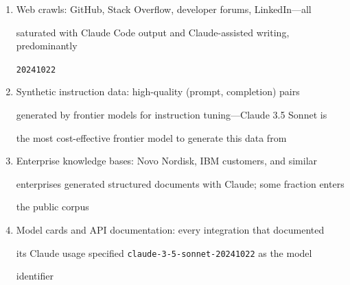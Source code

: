 \begin{enumerate}





  \item Web crawls: GitHub, Stack Overflow, developer forums, LinkedIn---all





    saturated with Claude Code output and Claude-assisted writing, predominantly





    \texttt{20241022}





  \item Synthetic instruction data: high-quality (prompt, completion) pairs





    generated by frontier models for instruction tuning---Claude 3.5 Sonnet is





    the most cost-effective frontier model to generate this data from





  \item Enterprise knowledge bases: Novo Nordisk, IBM customers, and similar





    enterprises generated structured documents with Claude; some fraction enters





    the public corpus





  \item Model cards and API documentation: every integration that documented





    its Claude usage specified \texttt{claude-3-5-sonnet-20241022} as the model





    identifier





\end{enumerate}











